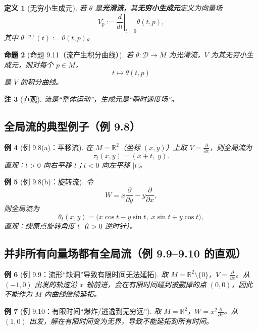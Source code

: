\documentclass[11pt]{article}
\newtheorem{definition}{定义}[section]
\newtheorem{proposition}[definition]{命题}
\newtheorem{example}[definition]{例}
\newtheorem{remark}[definition]{注}
\newcommand{\R}{\mathbb{R}}
\newcommand{\D}{\mathcal{D}}
\begin{document}
\begin{definition}[无穷小生成元]
若 $\theta$ 是\textbf{光滑流}，其\textbf{无穷小生成元}定义为向量场
\[
V_p := \left.\frac{d}{dt}\right|_{t=0}\theta(t,p),
\]
其中 $\theta^{(p)}(t):=\theta(t,p)$。
\end{definition}

\begin{proposition}[命题 9.11（流产生积分曲线）]
若 $\theta:\D\to M$ 为光滑流，$V$ 为其无穷小生成元，则对每个 $p\in M$，
\[
t\mapsto \theta(t,p)
\]
是 $V$ 的积分曲线。
\end{proposition}

\begin{remark}[直观]
流是“整体运动”，生成元是“瞬时速度场”。
\end{remark}

\subsection{全局流的典型例子（例 9.8）}

\begin{example}[例 9.8(a)：平移流]
在 $M=\R^2$（坐标 $(x,y)$）上取 $V=\frac{\partial}{\partial x}$，则全局流为
\[
\tau_t(x,y)=(x+t,\;y).
\]
直观：$t>0$ 向右平移 $t$；$t<0$ 向左平移 $|t|$。
\end{example}

\begin{example}[例 9.8(b)：旋转流]
令
\[
W=x\frac{\partial}{\partial y}-y\frac{\partial}{\partial x},
\]
则全局流为
\[
\theta_t(x,y)=\bigl(x\cos t-y\sin t,\;x\sin t+y\cos t\bigr),
\]
直观：绕原点旋转角度 $t$（$t>0$ 逆时针）。
\end{example}

\subsection{并非所有向量场都有全局流（例 9.9--9.10 的直观）}

\begin{example}[例 9.9：流形“缺洞”导致有限时间无法延拓]
取 $M=\R^2\setminus\{0\}$，$V=\frac{\partial}{\partial x}$。从 $(-1,0)$ 出发的轨迹沿 $x$ 轴前进，会在有限时间碰到被删掉的点 $(0,0)$，因此不能作为 $M$ 内曲线继续延拓。
\end{example}

\begin{example}[例 9.10：有限时间“爆炸/逃逸到无穷远”]
取 $M=\R^2$，$W=x^2\frac{\partial}{\partial x}$。从 $(1,0)$ 出发，解在有限时间变为无界，导致不能延拓到所有时间。
\end{example}
\end{document}
